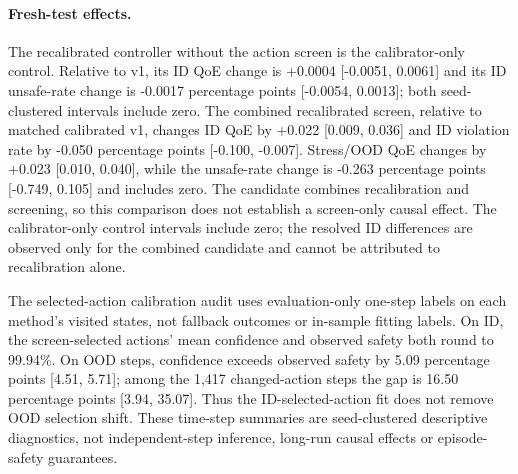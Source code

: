 \documentclass[10pt]{article}
\providecommand{\actioncalpath}{generated-action-calibration-v6}
\begin{document}
\paragraph{Fresh-test effects.}
The recalibrated controller without the action screen is the calibrator-only control. Relative to v1, its ID QoE change is +0.0004 [-0.0051, 0.0061] and its ID unsafe-rate change is -0.0017 percentage points [-0.0054, 0.0013]; both seed-clustered intervals include zero. The combined recalibrated screen, relative to matched calibrated v1, changes ID QoE by +0.022 [0.009, 0.036] and ID violation rate by -0.050 percentage points [-0.100, -0.007]. Stress/OOD QoE changes by +0.023 [0.010, 0.040], while the unsafe-rate change is -0.263 percentage points [-0.749, 0.105] and includes zero. The candidate combines recalibration and screening, so this comparison does not establish a screen-only causal effect. The calibrator-only control intervals include zero; the resolved ID differences are observed only for the combined candidate and cannot be attributed to recalibration alone.

\begin{table}[t]
\centering\resizebox{\textwidth}{!}{}
\caption{V6 fresh-test QoE, unsafe frequency and fallback rates for all eight controllers. Brackets show 95\% intervals resampling ten source-model seeds conditional on the fixed trace panel.}
\label{tab:v6-comparison}
\end{table}

\begin{table}[t]
\centering\resizebox{\textwidth}{!}{}
\caption{V6 paired fresh-test effects of the recalibrated screen versus matched calibrated v1. Violation contrasts are percentage points; intervals resample model seeds.}
\label{tab:v6-contrasts}
\end{table}

The selected-action calibration audit uses evaluation-only one-step labels on each method's visited states, not fallback outcomes or in-sample fitting labels. On ID, the screen-selected actions' mean confidence and observed safety both round to 99.94\%. On OOD steps, confidence exceeds observed safety by 5.09 percentage points [4.51, 5.71]; among the 1,417 changed-action steps the gap is 16.50 percentage points [3.94, 35.07]. Thus the ID-selected-action fit does not remove OOD selection shift. These time-step summaries are seed-clustered descriptive diagnostics, not independent-step inference, long-run causal effects or episode-safety guarantees.
\end{document}
